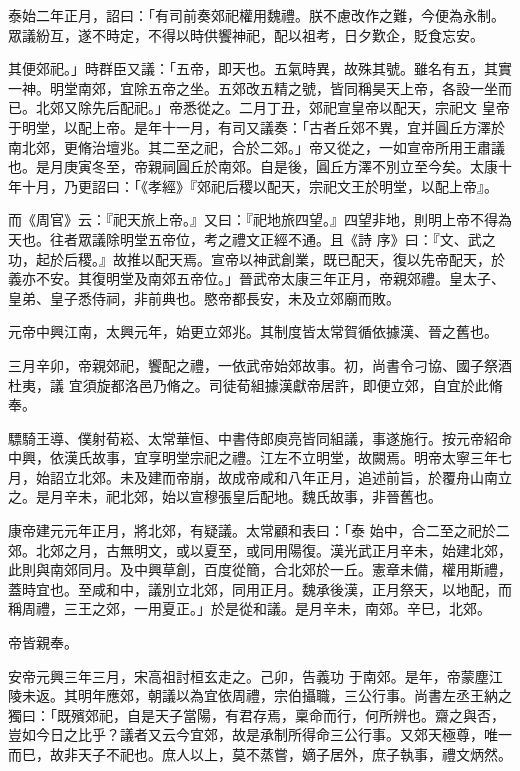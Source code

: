 \begin{pinyinscope}
 泰始二年正月，詔曰：「有司前奏郊祀權用魏禮。朕不慮改作之難，今便為永制。眾議紛互，遂不時定，不得以時供饗神祀，配以祖考，日夕歎企，貶食忘安。



 其便郊祀。」時群臣又議：「五帝，即天也。五氣時異，故殊其號。雖名有五，其實一神。明堂南郊，宜除五帝之坐。五郊改五精之號，皆同稱昊天上帝，各設一坐而已。北郊又除先后配祀。」帝悉從之。二月丁丑，郊祀宣皇帝以配天，宗祀文
 皇帝于明堂，以配上帝。是年十一月，有司又議奏：「古者丘郊不異，宜并圓丘方澤於南北郊，更脩治壇兆。其二至之祀，合於二郊。」帝又從之，一如宣帝所用王肅議也。是月庚寅冬至，帝親祠圓丘於南郊。自是後，圓丘方澤不別立至今矣。太康十年十月，乃更詔曰：「《孝經》『郊祀后稷以配天，宗祀文王於明堂，以配上帝』。



 而《周官》云：『祀天旅上帝。』又曰：『祀地旅四望。』四望非地，則明上帝不得為天也。往者眾議除明堂五帝位，考之禮文正經不通。且《詩
 序》曰：『文、武之功，起於后稷。』故推以配天焉。宣帝以神武創業，既已配天，復以先帝配天，於義亦不安。其復明堂及南郊五帝位。」晉武帝太康三年正月，帝親郊禮。皇太子、皇弟、皇子悉侍祠，非前典也。愍帝都長安，未及立郊廟而敗。



 元帝中興江南，太興元年，始更立郊兆。其制度皆太常賀循依據漢、晉之舊也。



 三月辛卯，帝親郊祀，饗配之禮，一依武帝始郊故事。初，尚書令刁協、國子祭酒杜夷，議
 宜須旋都洛邑乃脩之。司徒荀組據漢獻帝居許，即便立郊，自宜於此脩奉。



 驃騎王導、僕射荀崧、太常華恒、中書侍郎庾亮皆同組議，事遂施行。按元帝紹命中興，依漢氏故事，宜享明堂宗祀之禮。江左不立明堂，故闕焉。明帝太寧三年七月，始詔立北郊。未及建而帝崩，故成帝咸和八年正月，追述前旨，於覆舟山南立之。是月辛未，祀北郊，始以宣穆張皇后配地。魏氏故事，非晉舊也。



 康帝建元元年正月，將北郊，有疑議。太常顧和表曰：「泰
 始中，合二至之祀於二郊。北郊之月，古無明文，或以夏至，或同用陽復。漢光武正月辛未，始建北郊，此則與南郊同月。及中興草創，百度從簡，合北郊於一丘。憲章未備，權用斯禮，蓋時宜也。至咸和中，議別立北郊，同用正月。魏承後漢，正月祭天，以地配，而稱周禮，三王之郊，一用夏正。」於是從和議。是月辛未，南郊。辛巳，北郊。



 帝皆親奉。



 安帝元興三年三月，宋高祖討桓玄走之。己卯，告義功
 于南郊。是年，帝蒙塵江陵未返。其明年應郊，朝議以為宜依周禮，宗伯攝職，三公行事。尚書左丞王納之獨曰：「既殯郊祀，自是天子當陽，有君存焉，稟命而行，何所辨也。齋之與否，豈如今日之比乎？議者又云今宜郊，故是承制所得命三公行事。又郊天極尊，唯一而巳，故非天子不祀也。庶人以上，莫不蒸嘗，嫡子居外，庶子執事，禮文炳然。




\end{pinyinscope}
